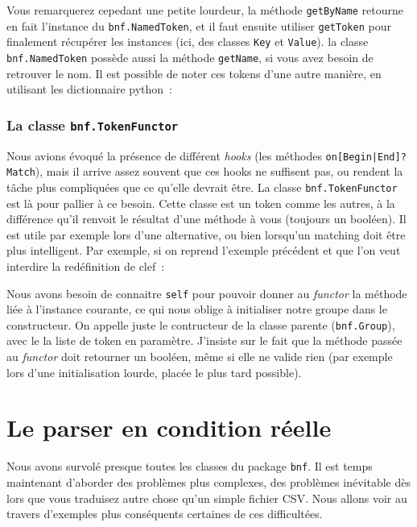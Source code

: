 \documentclass[a4paper]{article}
\newcommand{\fixed}[1]{\texttt{#1}}
\begin{document}
                Vous remarquerez cepedant une petite lourdeur, la méthode \fixed{getByName}
                retourne en fait l'instance du \fixed{bnf.NamedToken}, et il faut ensuite
                utiliser \fixed{getToken} pour finalement récupérer les instances (ici, des
                classes \fixed{Key} et \fixed{Value}). la classe \fixed{bnf.NamedToken}
                possède aussi la méthode \fixed{getName}, si vous avez besoin de retrouver
                le nom. Il est possible de noter ces tokens d'une autre manière, en
                utilisant les dictionnaire python~:


            \subsubsection{La classe \fixed{bnf.TokenFunctor}}
                Nous avions évoqué la présence de différent \emph{hooks} (les méthodes
                \fixed{on[Begin|End]?Match}),
                mais il arrive assez souvent que ces hooks ne suffisent pas, ou
                rendent la tâche plus
                compliquées que ce qu'elle devrait être. La classe
                \fixed{bnf.TokenFunctor} est là pour pallier à ce besoin. Cette
                classe est un token comme les autres, à la différence qu'il
                renvoit le résultat d'une méthode à vous (toujours un booléen).
                Il est utile par exemple lors d'une alternative, ou bien lorsqu'un
                matching doit être plus intelligent.
                Par exemple, si on reprend l'exemple précédent et que l'on veut interdire la
                redéfinition de clef~:

                Nous avons besoin de connaitre \fixed{self} pour pouvoir donner au
                \emph{functor} la méthode liée à l'instance courante, ce qui nous
                oblige à initialiser notre groupe dans le constructeur. On appelle
                juste le contructeur de la classe parente (\fixed{bnf.Group}),
                avec le la liste de token en paramètre. J'insiste sur le fait
                que la méthode passée
                au \emph{functor} doit retourner un booléen, même si elle ne valide rien (par
                exemple lors d'une initialisation lourde, placée le plus tard possible).


    \newpage
    \section{Le parser en condition réelle}
        Nous avons survolé presque toutes les classes du package \fixed{bnf}.
        Il est temps maintenant d'aborder des problèmes plus complexes, des
        problèmes inévitable dès lors que vous traduisez autre chose qu'un
        simple fichier CSV. Nous allons voir au travers d'exemples plus
        conséquents certaines de ces difficultées.
\end{document}
